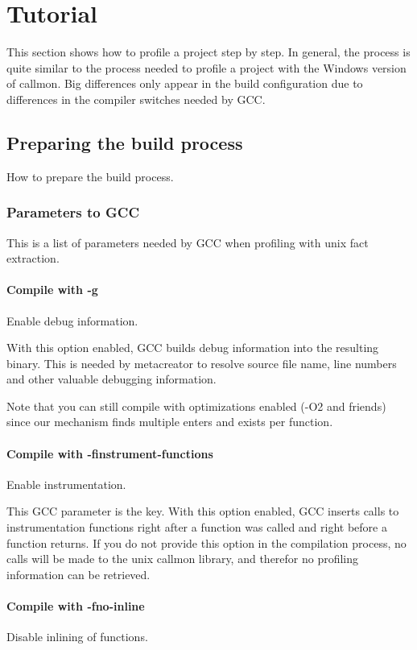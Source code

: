 
\section{Tutorial}
\label{sec:Tutorial}

This section shows how to profile a project step by step. In general, the process is quite similar to the process needed to profile a project with the Windows version of callmon. Big differences only appear in the build configuration due to differences in the compiler switches needed by GCC.

\subsection{Preparing the build process} How to prepare the build process.

\subsubsection{Parameters to GCC} This is a list of parameters needed by GCC when profiling with unix fact extraction.

\paragraph{Compile with -g} Enable debug information.

With this option enabled, GCC builds debug information into the resulting binary. This is needed by metacreator to resolve source file name, line numbers and other valuable debugging information.

Note that you can still compile with optimizations enabled (-O2 and friends) since our mechanism finds multiple enters and exists per function.

\paragraph{Compile with -finstrument-functions} Enable instrumentation.

This GCC parameter is the key. With this option enabled, GCC inserts calls to instrumentation functions right after a function was called and right before a function returns. If you do not provide this option in the compilation process, no calls will be made to the unix callmon library, and therefor no profiling information can be retrieved.

\paragraph{Compile with -fno-inline} Disable inlining of functions.

